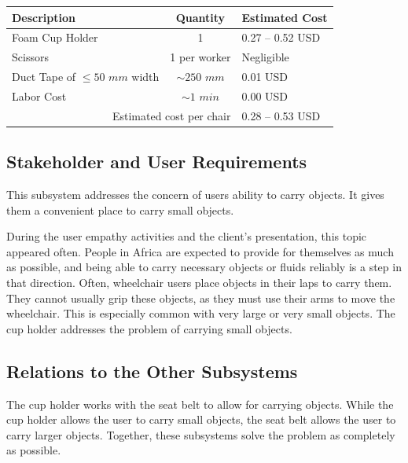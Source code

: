 \documentclass[12pt]{report}
\begin{document}
\begin{table}[H]
    \centering
    \label{tbl:cupholder-cost}
    \caption{Cup Holder Cost Analysis}
    \begin{longtable}{l c l}
        Description & Quantity & Estimated Cost \\
        \hline
        Foam Cup Holder & 1 & 0.27 -- 0.52 USD\cite{cost-cupholder} \\
        Scissors & 1 per worker & Negligible \\
        Duct Tape of $\leq 50$ $mm$ width & $\sim 250$ $mm$ & 0.01
        USD\footnotemark[1] \\
        Labor Cost & $\sim 1$ $min$ & 0.00 USD\footnotemark[2] \\
        \hline
        \multicolumn{2}{r}{Estimated cost per chair} & 0.28 -- 0.53 USD
    \end{longtable}
\end{table}
\subsection{Stakeholder and User Requirements}
This subsystem addresses the concern of users ability to carry objects. It
gives them a convenient place to carry small objects.

During the user empathy activities and the client's presentation, this
topic appeared often. People in Africa are expected to provide for
themselves as much as possible, and being able to carry necessary objects
or fluids reliably is a step in that direction. Often, wheelchair users
place objects in their laps to carry them. They cannot usually grip these
objects, as they must use their arms to move the wheelchair. This
is especially common with very large or very small objects. The cup holder
addresses the problem of carrying small objects.

\subsection{Relations to the Other Subsystems}
The cup holder works with the seat belt to allow for carrying objects. While
the cup holder allows the user to carry small objects, the seat belt allows the
user to carry larger objects. Together, these subsystems solve the problem as
completely as possible.
\end{document}
